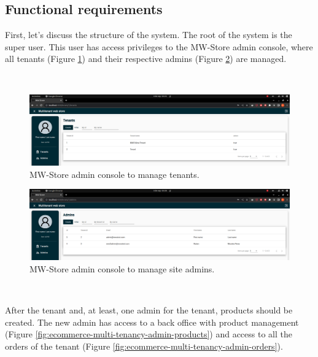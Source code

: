\documentclass[12pt,english]{article} %
\begin{document}
\subsection{Functional requirements}
First, let's discuss the structure of the system.
The root of the system is the super user.
This user has access privileges to the MW-Store admin console, where all tenants (Figure \ref{fig:ecommerce-multi-tenancy-tenants}) and their respective admins (Figure \ref{fig:ecommerce-multi-tenancy-admins}) are managed.

\

\begin{figure}[H]
    \centering
    \includegraphics[scale=0.245]{img/mws/ecommerce-multi-tenancy-tenants.png}
    \caption{MW-Store admin console to manage tenants.}
    \label{fig:ecommerce-multi-tenancy-tenants}
\end{figure}

\begin{figure}[H]
    \centering
    \includegraphics[scale=0.245]{img/mws/ecommerce-multi-tenancy-admins.png}
    \caption{MW-Store admin console to manage site admins.}
    \label{fig:ecommerce-multi-tenancy-admins}
\end{figure}

\

After the tenant and, at least, one admin for the tenant, products should be created.
The new admin has access to a back office with product management (Figure \ref{fig:ecommerce-multi-tenancy-admin-products}) and access to all the orders of the tenant (Figure \ref{fig:ecommerce-multi-tenancy-admin-orders}).

\
\end{document}
